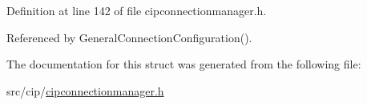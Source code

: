 \-Definition at line 142 of file cipconnectionmanager.\-h.



\-Referenced by \-General\-Connection\-Configuration().



\-The documentation for this struct was generated from the following file\-:\begin{DoxyCompactItemize}
\item 
src/cip/\hyperlink{cipconnectionmanager_8h}{cipconnectionmanager.\-h}\end{DoxyCompactItemize}
